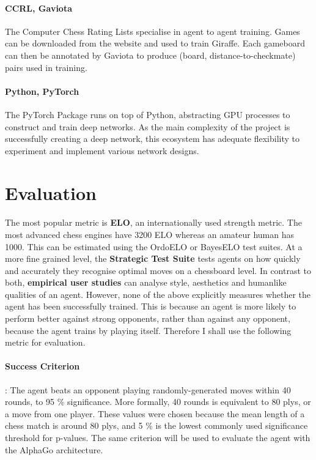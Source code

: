 \documentclass[a4paper]{article}
\begin{document}
\paragraph{CCRL, Gaviota} The Computer Chess Rating Lists specialise in agent to agent training. Games can be downloaded from the website and used to train Giraffe. Each gameboard can then be annotated by Gaviota to produce (board, distance-to-checkmate) pairs used in training. \cite{gaviota} \cite{giraffe}

\paragraph{Python, PyTorch} The PyTorch Package runs on top of Python, abstracting GPU processes to construct and train deep networks. As the main complexity of the project is successfully creating a deep network, this ecosystem has adequate flexibility to experiment and implement various network designs. \cite{PyTorch} 


\section*{Evaluation}

\paragraph{} The most popular metric is \textbf{ELO}, an internationally used strength metric. The most advanced chess engines have 3200 ELO whereas an amateur human has 1000. \cite{giraffe} This can be estimated using the OrdoELO or BayesELO test suites. At a more fine grained level, the \textbf{Strategic Test Suite} tests agents on how quickly and accurately they recognise optimal moves on a chessboard level. \cite{sts} In contrast to both, \textbf{empirical user studies} can analyse style, aesthetics and humanlike qualities of an agent. However, none of the above explicitly measures whether the agent has been successfully trained. This is because an agent is more likely to perform better against strong opponents, rather than against any opponent, because the agent trains by playing itself. Therefore I shall use the following metric for evaluation.

\paragraph{Success Criterion}: The agent beats an opponent playing randomly-generated moves within 40 rounds, to 95 \% significance. More formally, 40 rounds is equivalent to 80 plys, or a move from one player. These values were chosen because the mean length of a chess match is around 80 plys, and 5 \% is the lowest commonly used significance threshold for p-values. The same criterion will be used to evaluate the agent with the AlphaGo architecture.
\end{document}
